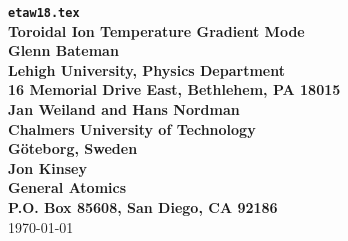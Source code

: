 
\headheight 0pt \headsep 0pt          
\topmargin 0pt  \textheight 9.0in
\oddsidemargin 0pt \textwidth 6.5in

\newcommand{\Partial}[2]{\frac{\partial #1}{\partial #2}}
\newcommand{\jacobian}{{\cal J}}



\begin{center} 
{\bf {\tt etaw18.tex} \\
Toroidal Ion Temperature Gradient Mode \\
\vspace{1pc}
Glenn Bateman \\
Lehigh University, Physics Department \\
16 Memorial Drive East, Bethlehem, PA 18015 \\
\vspace{1pc}
Jan Weiland and Hans Nordman \\
Chalmers University of Technology \\
G\"{o}teborg, Sweden \\
\vspace{1pc}
Jon Kinsey \\
General Atomics \\
P.O. Box 85608, San Diego, CA 92186} \\ 
\vspace{1pc}
\today
\end{center}


